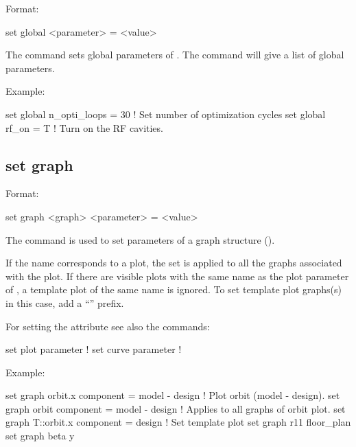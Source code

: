 {{Format:
\begin{example}
  set global <parameter> = <value>
\end{example}

The  command sets global parameters of \tao. The  command will give
a list of global parameters.

Example:
\begin{example}
  set global n_opti_loops = 30  ! Set number of optimization cycles
  set global rf_on = T          ! Turn on the RF cavities.
\end{example}


\subsection{set graph}
\label{s:set.graph}

Format:
\begin{example}
  set graph <graph> <parameter> = <value>
\end{example}

The  command is used to set parameters of a graph structure ().

If the  name corresponds to a plot, the set is applied to all the graphs associated with
the plot. If there are visible plots with the same name as the plot parameter of , a
template plot of the same name is ignored. To set template plot graphs(s) in this case, add a
``'' prefix.

For setting the  attribute see also the commands:
\begin{example}
  set plot parameter      ! 
  set curve parameter     ! 
\end{example}

Example:
\begin{example}
  set graph orbit.x component = model - design  ! Plot orbit (model - design).
  set graph orbit component = model - design    ! Applies to all graphs of orbit plot.
  set graph T::orbit.x component = design       ! Set template plot
  set graph r11 floor_plan%
  set graph beta y%
\end{example}


}}
